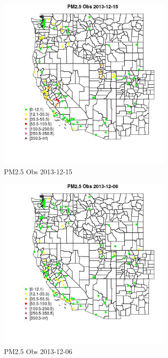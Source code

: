 \begin{figure} 
\centering  
\includegraphics[width=0.77\textwidth]{Code_Outputs/Report_ML_input_PM25_Step4_part_e_de_duplicated_aves_MapObsPM25_Obs2013-12-15.jpg} 
\caption{\label{fig:Report_ML_input_PM25_Step4_part_e_de_duplicated_avesMapObsPM25_Obs2013-12-15}PM2.5 Obs 2013-12-15} 
\end{figure} 
 

\begin{figure} 
\centering  
\includegraphics[width=0.77\textwidth]{Code_Outputs/Report_ML_input_PM25_Step4_part_e_de_duplicated_aves_MapObsPM25_Obs2013-12-06.jpg} 
\caption{\label{fig:Report_ML_input_PM25_Step4_part_e_de_duplicated_avesMapObsPM25_Obs2013-12-06}PM2.5 Obs 2013-12-06} 
\end{figure} 
 

